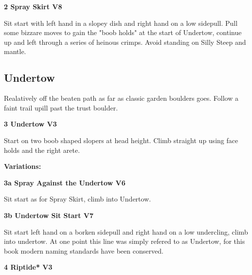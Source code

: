 \begin{multicols}{2}
					\label{rt:Spray Skirt}
\colorbox{Goldenrod!50}{
\parbox{0.95\linewidth}{
\textbf{
2 Spray Skirt V8  
}
}
}

					\begin{adjustwidth}{0.5cm}{}				
					Sit start with left hand in a slopey dish and right hand on a low sidepull. Pull some bizzare moves to gain the "boob holds" at the start of Undertow, continue up and left through a series of heinous crimps. Avoid standing on Silly Steep and mantle.
					\end{adjustwidth}

			\subsection*{Undertow}\label{bf:Undertow}
			Realatively off the beaten path as far as classic garden boulders goes. Follow a faint trail upill past the trust boulder.\\
			
					\label{rt:Undertow}
\colorbox{green!20}{
\parbox{0.95\linewidth}{
\textbf{
3 Undertow V3  
}
}
}

					\begin{adjustwidth}{0.5cm}{}				
					Start on two boob shaped slopers at head height. Climb straight up using face holds and the right arete.
					\end{adjustwidth}
						\begin{adjustwidth}{0.5cm}{}				
						\textbf{Variations:} \newline
							\label{vr:Spray Against the Undertow}
\colorbox{RoyalBlue!20}{
\parbox{0.95\linewidth}{
\textbf{
3a Spray Against the Undertow V6  
}
}
}

							\begin{adjustwidth}{0.5cm}{}				
							Sit start as for Spray Skirt, climb into Undertow.
							\end{adjustwidth}
							\label{vr:Undertow Sit Start}
\colorbox{Goldenrod!50}{
\parbox{0.95\linewidth}{
\textbf{
3b Undertow Sit Start V7  
}
}
}

							\begin{adjustwidth}{0.5cm}{}				
							Sit start left hand on a borken sidepull and right hand on a low undercling, climb into undertow. At one point this line was simply refered to as Undertow, for this book modern naming standards have been conserved.
							\end{adjustwidth}
						\end{adjustwidth}
					\label{rt:Riptide}
\colorbox{green!20}{
\parbox{0.95\linewidth}{
\textbf{
4 Riptide* V3  
}
}
}


\end{multicols}
